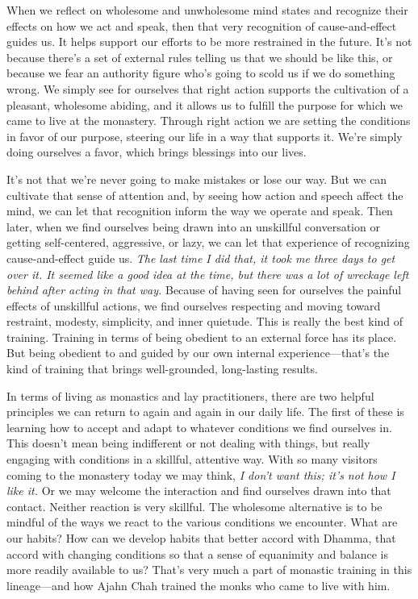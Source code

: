 When we reflect on wholesome and unwholesome mind states and recognize 
their effects on how we act and speak, then that very recognition of 
cause-and-effect guides us. It helps support our efforts to be more 
restrained in the future. It's not because there's a set of external 
rules telling us that we should be like this, or because we fear an 
authority figure who's going to scold us if we do something wrong. We 
simply see for ourselves that right action supports the cultivation of 
a pleasant, wholesome abiding, and it allows us to fulfill the purpose 
for which we came to live at the monastery. Through right action we are 
setting the conditions in favor of our purpose, steering our life in a 
way that supports it. We're simply doing ourselves a favor, which 
brings blessings into our lives.

It's not that we're never going to make mistakes or lose our way. But 
we can cultivate that sense of attention and, by seeing how action and 
speech affect the mind, we can let that recognition inform the way we 
operate and speak. Then later, when we find ourselves being drawn into 
an unskillful conversation or getting self-centered, aggressive, or 
lazy, we can let that experience of recognizing cause-and-effect guide 
us. \emph{The last time I did that, it took me three days to get over 
it. It seemed like a good idea at the time, but there was a lot of 
wreckage left behind after acting in that way.} Because of having seen 
for ourselves the painful effects of unskillful actions, we find 
ourselves respecting and moving toward restraint, modesty, simplicity, 
and inner quietude. This is really the best kind of training. Training 
in terms of being obedient to an external force has its place. But 
being obedient to and guided by our own internal experience---that's 
the kind of training that brings well-grounded, long-lasting results.


In terms of living as monastics and lay practitioners, there are two 
helpful principles we can return to again and again in our daily life. 
The first of these is learning how to accept and adapt to whatever 
conditions we find ourselves in. This doesn't mean being indifferent or 
not dealing with things, but really engaging with conditions in a 
skillful, attentive way. With so many visitors coming to the monastery 
today we may think, \emph{I don't want this; it's not how I like it.} 
Or we may welcome the interaction and find ourselves drawn into that 
contact. Neither reaction is very skillful. The wholesome alternative 
is to be mindful of the ways we react to the various conditions we 
encounter. What are our habits? How can we develop habits that better 
accord with Dhamma, that accord with changing conditions so that a 
sense of equanimity and balance is more readily available to us? That's 
very much a part of monastic training in this lineage---and how Ajahn 
Chah trained the monks who came to live with him.

